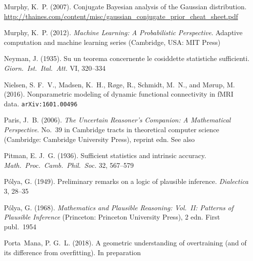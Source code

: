 \documentclass[%
]{frontiersSCNS-nologo} %
\newcommand*{\langitalian}{\foreignlanguage{italian}}
\providecommand{\href}[2]{#2}
\newcommand*{\citebi}[2][]{\citet[#1]{#2}%
}
\newcommand*{\arxiveprint}[1]{%
\texttt{\urlalt{https://arxiv.org/abs/#1}{arXiv:\hspace{0pt}#1}}%
}
\providecommand*{\urlalt}{\href}
\renewcommand*{\|}{\mathpunct{|}}%
\begin{document}
\begin{thebibliography}{156}
Murphy, K.~P. (2007).
\newblock Conjugate {Bayesian} analysis of the {Gaussian} distribution.
\newblock
  \url{http://thaines.com/content/misc/gaussian_conjugate_prior_cheat_sheet.pdf}

Murphy, K.~P. (2012).
\newblock \emph{Machine Learning: A Probabilistic Perspective}.
\newblock Adaptive computation and machine learning series (Cambridge, USA: MIT
  Press)

Neyman, J. (1935).
\newblock \langitalian{{Su} un teorema concernente le cosiddette statistiche
  sufficienti}.
\newblock \emph{\langitalian{Giorn.\ Ist.\ Ital.\ Att.}} VI, 320--334

Nielsen, S. F.~V., Madsen, K.~H., R{\o}ge, R., Schmidt, M.~N., and M{\o}rup, M.
  (2016).
\newblock Nonparametric modeling of dynamic functional connectivity in {fMRI}
  data.
\newblock \arxiveprint{1601.00496}

Paris, J.~B. (2006).
\newblock \emph{The Uncertain Reasoner's Companion: A Mathematical
  Perspective}.
\newblock No.~39 in Cambridge tracts in theoretical computer science
  (Cambridge: Cambridge University Press), reprint edn.
\newblock See also \citebi{snow1998}

Pitman, E. J.~G. (1936).
\newblock Sufficient statistics and intrinsic accuracy.
\newblock \emph{Math.\ Proc.\ Camb.\ Phil.\ Soc.} 32, 567--579

P{\'o}lya, G. (1949).
\newblock Preliminary remarks on a logic of plausible inference.
\newblock \emph{Dialectica} 3, 28--35

P{\'o}lya, G. (1968).
\newblock \emph{Mathematics and Plausible Reasoning: Vol.~II: Patterns of
  Plausible Inference} (Princeton: Princeton University Press), 2 edn.
\newblock First publ.\ 1954

Porta~Mana, P. G.~L. (2018{}).
\newblock A geometric understanding of overtraining (and of its difference from
  overfitting).
\newblock In preparation


\end{thebibliography}
\end{document}
